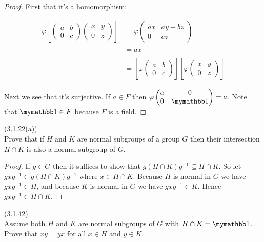 \documentclass{exam}
\begin{document}
\begin{questions}
\begin{proof}
  First that it's a homomorphism:

  \begin{align*}
    \varphi\left[
    \begin{pmatrix}
        a & b \\ 0 & c
    \end{pmatrix}
    \begin{pmatrix}
        x & y \\ 0 & z
    \end{pmatrix}\right] &=
    \varphi
    \begin{pmatrix}
        ax & ay+bz \\ 0 & cz
    \end{pmatrix} \\\\
  &= ax \\\\
  &= \left[\varphi
  \begin{pmatrix}
      a & b \\ 0 & c
  \end{pmatrix}\right]
  \left[\varphi
  \begin{pmatrix}
      x & y \\ 0 & z
  \end{pmatrix}\right]
  \end{align*}

  Next we see that it's surjective.  If $a\in F$ then $\varphi
  \begin{pmatrix}
      a & 0 \\ 0 & \mymathbb 1
  \end{pmatrix} = a$.  Note that $\mymathbb 1\in F$ because $F$ is a field.
\end{proof}

\question(3.1.22(a))\\
Prove that if $H$ and $K$ are normal subgroups of a group $G$ then their intersection $H\cap K$ is also a normal subgroup of $G$.

\begin{proof}
  If $g\in G$ then it suffices to show that $g(H\cap K)g^{-1}\subseteq H\cap K$.  So let $gxg^{-1}\in g(H\cap K)g^{-1}$ where $x\in H\cap K$.  Because $H$ is normal in $G$ we have $gxg^{-1}\in H$, and because $K$ is normal in $G$ we have $gxg^{-1}\in K$.  Hence $gxg^{-1}\in H\cap K$.
\end{proof}

\question(3.1.42)\\
Assume both $H$ and $K$ are normal subgroups of $G$ with $H\cap K=\mymathbb 1$.  Prove that $xy=yx$ for all $x\in H$ and $y\in K$.


\end{questions}
\end{document}
